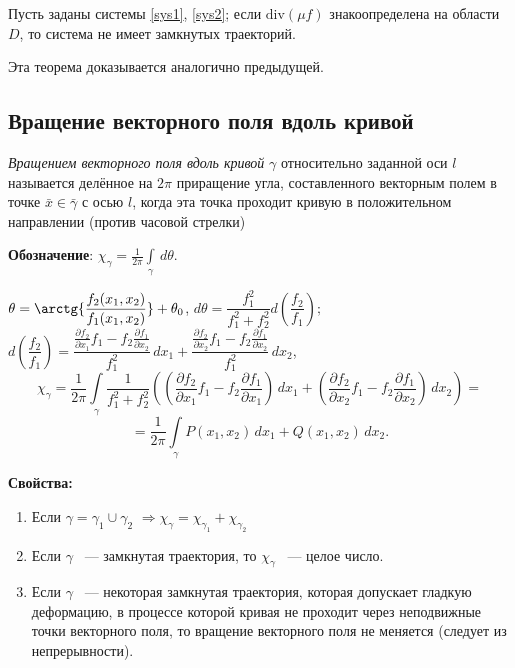 \begin{theorem}
    Пусть заданы системы \ref{sys1}, \ref{sys2}; если \( \mathrm{div}(\mu f) \) знакоопределена на области \( D \), то система не имеет замкнутых траекторий.
\end{theorem}

Эта теорема доказывается аналогично предыдущей.

\subsection{Вращение векторного поля вдоль кривой}

\begin{definition}
    \textit{Вращением векторного поля вдоль кривой} $\gamma$ относительно заданной оси $l$ называется делённое на $2\pi$ приращение угла, составленного векторным полем в точке $\bar{x} \in \bar{\gamma}$ с осью $l$, когда эта точка проходит кривую в положительном направлении (против часовой стрелки)
\end{definition}

\textbf{Обозначение}: \( \chi_\gamma = \frac{1}{2 \pi} \int \limits_{\gamma} \, d\theta \).

\( \theta = \arctg{\dfrac{f_2(x_1, x_2)}{f_1(x_1, x_2)}} + \theta_0 \), \( d\theta = \dfrac{f_1^2}{f_1^2 + f_2^2} d\left( \dfrac{f_2}{f_1} \right); \) \( d\left( \dfrac{f_2}{f_1} \right) = \dfrac{\frac{\partial f_2}{\partial x_1} f_1 - f_2 \frac{\partial f_1}{\partial x_2}}{f_1^2} \, dx_1 + \dfrac{\frac{\partial f_2}{\partial x_2} f_1 - f_2 \frac{\partial f_1}{\partial x_2}}{f_1^2} \, dx_2 \),
\[ \chi_\gamma = \dfrac{1}{2\pi} \int \limits_{\gamma} \dfrac{1}{f_1^2 + f_2^2} \left( \left( \dfrac{\partial f_2}{\partial x_1} f_1 - f_2 \dfrac{\partial f_1}{\partial x_1} \right) \, dx_1 + \left( \dfrac{\partial f_2}{\partial x_2} f_1 - f_2 \dfrac{\partial f_1}{\partial x_2} \right) \, dx_2 \right) = \]
\[ = \dfrac{1}{2\pi} \int \limits_{\gamma} P(x_1, x_2) \, dx_1 + Q(x_1, x_2) \, dx_2. \]

\textbf{Свойства:}
\begin{enumerate}
\item Если \( \gamma = \gamma_1 \cup \gamma_2 \) \( \Rightarrow \chi_{\gamma} = \chi_{\gamma_1} + \chi_{\gamma_2} \)
\item Если \( \gamma \) ~--- замкнутая траектория, то \( \chi_\gamma \) ~--- целое число.
\item Если \( \gamma \) ~--- некоторая замкнутая траектория, которая допускает гладкую деформацию, в процессе которой кривая не проходит через неподвижные точки векторного поля, то вращение векторного поля не меняется (следует из непрерывности).
\end{enumerate}

